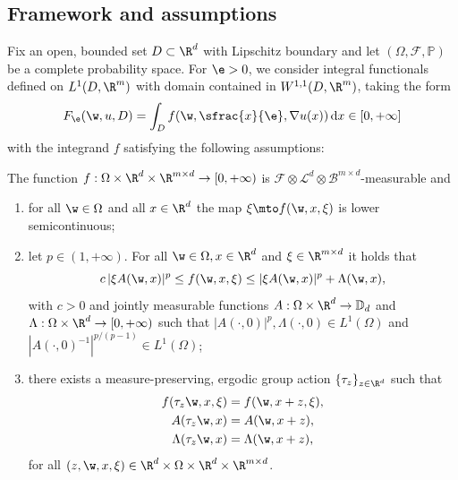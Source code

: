 \subsection{Framework and assumptions}
Fix an open, bounded set $D\subset \R^d$ with Lipschitz boundary and let $(\Omega,\mathcal{F},\mathbb{P})$ be a complete probability space. For $\e>0$, we consider integral functionals defined on $L^1(D,\R^m)$ with domain contained in $W^{1,1}(D,\R^m)$, taking the form
\begin{equation*}
F_{\e}(\w,u,D)=\int_D f(\w,\sfrac{x}{\e},\nabla u(x))\,\mathrm{d}x\in [0,+\infty]
\end{equation*}
with the integrand $f$ satisfying the following assumptions:
\begin{assumption}\label{a.1} The function $f:\Omega\times\R^d\times\R^{m\times d}\to [0,+\infty)$ is $\mathcal{F}\otimes\mathcal{L}^d\otimes\mathcal{B}^{m\times d}$-measurable and
\begin{enumerate}\renewcommand{\theenumi}{A\arabic{enumi}}
\item\label{A1} for all $\w\in\Omega$ and all $x\in\R^d$ the map $\xi\mto f(\w,x,\xi)$ is lower semicontinuous;
\item\label{A2} let $p\in (1,+\infty)$. For all $\w\in\Omega,x\in\R^d$ and $\xi\in \R^{m\times d}$ it holds that
\begin{equation*}
c\,|\xi A(\w,x)|^p\leq f(\w,x,\xi)\leq |\xi A(\w,x)|^p+\Lambda(\w,x),
\end{equation*}
with $c>0$ and jointly measurable functions $A:\Omega\times\R^d\to \mathbb{D}_{d}$ and $\Lambda:\Omega\times\R^d\to [0,+\infty)$ such that $|A(\cdot,0)|^p,\Lambda(\cdot,0)\in L^1(\Omega)$ and $|A(\cdot,0)^{-1}|^{p/(p-1)}\in L^{1}(\Omega)$;
\item\label{A3} there exists a measure-preserving, ergodic group action $\{\tau_{z}\}_{z\in\R^d}$ such that
\begin{equation*}
\begin{split}
f(\tau_z\w,x,\xi)&=f(\w,x+z,\xi),
\\
A(\tau_z\w,x)&=A(\w,x+z),
\\
\Lambda(\tau_z\w,x)&=\Lambda(\w,x+z),
\end{split}
\end{equation*}
for all $(z,\w,x,\xi)\in \R^d\times\Omega\times\R^d\times\R^{m\times d}$.
\end{enumerate}
\end{assumption}
\skpt
